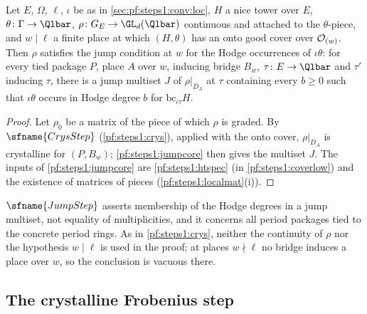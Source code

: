 \begin{theorem}\label{pf:steps1:jump}
Let $E$, $\Omega$, $\ell$, $\iota$ be as in \cref{sec:pf:steps1:conv:loc}, $H$ a nice tower over $E$, $\theta\colon\Gamma\to\Qlbar$,
$\rho\colon G_E\to\GL_d(\Qlbar)$ continuous and attached to the $\theta$-piece, and $w\mid\ell$ a finite place at which $(H,\theta)$
has an onto good cover over $\mathcal{O}_{(w)}$. Then $\rho$ satisfies the jump condition at $w$ for the Hodge occurrences of $\iota\theta$:
for every tied package $P$, place $A$ over $w$, inducing bridge $B_w$, $\tau\colon E\to\Qlbar$ and $\tau'$ inducing $\tau$, there is a
jump multiset $J$ of $\rho|_{D_A}$ at $\tau$ containing every $b\ge0$ such that $\iota\theta$ occurs in Hodge degree $b$ for
$\mathrm{bc}_{\iota\tau}H$. 
\end{theorem}

\begin{proof}
Let $\rho_0$ be a matrix of the piece of which $\rho$ is graded. By $\sfname{CrysStep}$ (\cref{pf:steps1:crys}), applied with the
onto cover, $\rho|_{D_A}$ is crystalline for $(P,B_w)$; \cref{pf:steps1:jumpcore} then gives the multiset $J$. The inputs of
\cref{pf:steps1:jumpcore} are \cref{pf:steps1:htspec} (in \cref{pf:steps1:coverlow}) and the existence of matrices of pieces
(\cref{pf:steps1:localmat}(i)).
\end{proof}

\begin{remark}
$\sfname{JumpStep}$ asserts membership of the Hodge degrees in a jump multiset, not equality of multiplicities, and it concerns all
period packages tied to the concrete period rings. As in \cref{pf:steps1:crys}, neither the continuity of $\rho$ nor the hypothesis
$w\mid\ell$ is used in the proof; at places $w\nmid\ell$ no bridge induces a place over $w$, so the conclusion is vacuous there.
\end{remark}

\subsection{The crystalline Frobenius step}\label{sec:pf:steps1:phi}

